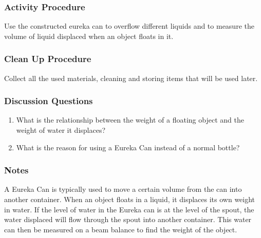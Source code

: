 \subsubsection*{Activity Procedure}
Use the constructed eureka can to overflow different liquids and to measure the volume of liquid displaced when an object floats in it.

\subsubsection*{Clean Up Procedure}
Collect all the used materials, cleaning and storing items that will be used later.

\subsubsection*{Discussion Questions}
\begin{enumerate}
\item{What is the relationship between the weight of a floating object and the weight of water it displaces?}
\item{What is the reason for using a Eureka Can instead of a normal bottle?}
\end{enumerate}

\subsubsection*{Notes}
A Eureka Can is typically used to move a certain volume from the can into another container.  When an object floats in a liquid, it displaces its own weight in water.  If the level of water in the Eureka can is at the level of the spout, the water displaced will flow through the spout into another container.  This water can then be measured on a beam balance to find the weight of the object.
